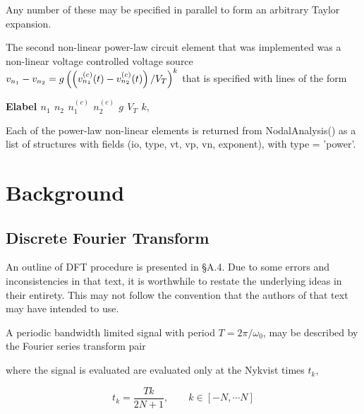 Any number of these may be specified in parallel to form an arbitrary Taylor expansion.

The second non-linear power-law circuit element that was implemented was a non-linear voltage controlled voltage source 
\( v_{n_1} - v_{n_2} = g \left( \left(v_{n_1}^{(c)}(t) - v_{n_2}^{(c)}(t)\right)/V_T\right)^k \)
that is specified with lines of the form

\begin{center}
\textbf{Elabel \(n_1\) \(n_2\) \(n^{(c)}_1\) \(n^{(c)}_2\) \(g\) \(V_T\) \( k \)},
\end{center}

Each of the power-law non-linear elements is returned from NodalAnalysis() as a list of structures with fields (io, type, vt, vp, vn, exponent), with type = 'power'.

\section{Background}
\subsection{Discrete Fourier Transform}

An outline of DFT procedure is presented in \citep{giannini2004NonlinearMicrowaveCircuitDesign} \S A.4.  Due to some errors and inconsistencies in that text, it is worthwhile to restate the underlying ideas in their entirety.  This may not follow the convention that the authors of that text may have intended to use.

A periodic bandwidth limited signal with period \( T = 2 \pi/\omega_0 \), may be described by the Fourier series transform pair


where the signal is evaluated are evaluated only at the Nykvist times
\( t_k \),

\begin{equation}\label{eqn:ece1254projectReport:20}
t_k = \frac{T k}{2 N + 1}, \qquad k \in [-N, \cdots N]
\end{equation}


